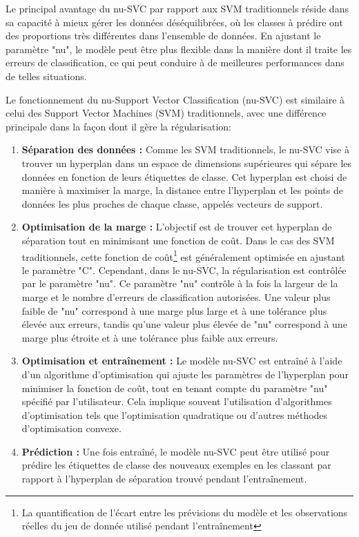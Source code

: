 Le principal avantage du nu-SVC par rapport aux SVM traditionnels réside dans sa capacité à mieux gérer les données déséquilibrées, où les classes à prédire ont des proportions très différentes dans l'ensemble de données. En ajustant le paramètre "nu", le modèle peut être plus flexible dans la manière dont il traite les erreurs de classification, ce qui peut conduire à de meilleures performances dans de telles situations.

Le fonctionnement du nu-Support Vector Classification (nu-SVC) est similaire à celui des Support Vector Machines (SVM) traditionnels, avec une différence principale dans la façon dont il gère la régularisation: 

\begin{enumerate}
    \item \textbf{Séparation des données :} Comme les SVM traditionnels, le nu-SVC vise à trouver un hyperplan dans un espace de dimensions supérieures qui sépare les données en fonction de leurs étiquettes de classe. Cet hyperplan est choisi de manière à maximiser la marge, la distance entre l'hyperplan et les points de données les plus proches de chaque classe, appelés vecteurs de support.
   
    \item \textbf{Optimisation de la marge :} L'objectif est de trouver cet hyperplan de séparation tout en minimisant une fonction de coût. Dans le cas des SVM traditionnels, cette fonction de coût\footnote{La quantification de l'écart entre les prévisions du modèle et les observations réelles du jeu de donnée utilisé pendant l'entraînement} est généralement optimisée en ajustant le paramètre "C". Cependant, dans le nu-SVC, la régularisation est contrôlée par le paramètre "nu". Ce paramètre "nu" contrôle à la fois la largeur de la marge et le nombre d'erreurs de classification autorisées. Une valeur plus faible de "nu" correspond à une marge plus large et à une tolérance plus élevée aux erreurs, tandis qu'une valeur plus élevée de "nu" correspond à une marge plus étroite et à une tolérance plus faible aux erreurs.
   
    \item \textbf{Optimisation et entraînement :} Le modèle nu-SVC est entraîné à l'aide d'un algorithme d'optimisation qui ajuste les paramètres de l'hyperplan pour minimiser la fonction de coût, tout en tenant compte du paramètre "nu" spécifié par l'utilisateur. Cela implique souvent l'utilisation d'algorithmes d'optimisation tels que l'optimisation quadratique ou d'autres méthodes d'optimisation convexe.
   
    \item \textbf{Prédiction :} Une fois entraîné, le modèle nu-SVC peut être utilisé pour prédire les étiquettes de classe des nouveaux exemples en les classant par rapport à l'hyperplan de séparation trouvé pendant l'entraînement.
\end{enumerate}







